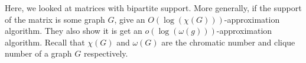 	Here, we looked at matrices with bipartite support. More generally, if the support of the matrix is some graph $G$, \cite{generalized-grothendieck-graph-supp} give an $O(\log(\chi(G)))$-approximation algorithm. They also show it is get an $o(\log(\omega(g)))$-approximation algorithm. Recall that $\chi(G)$ and $\omega(G)$ are the chromatic number and clique number of a graph $G$ respectively.


	

